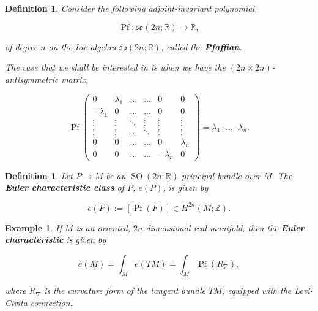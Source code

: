 \documentclass{article}
\newtheorem{defn}[theorem]{Definition\rm}
\newtheorem{example}{Example}
\newcommand{\ra}{\rightarrow}
\newcommand{\lra}{\longrightarrow}
\newcommand{\RR}{\mathbb{R}}
\newcommand{\ZZ}{\mathbb{Z}}
\newcommand{\mf}[1]{\mathfrak{#1}}
\DeclareMathOperator{\Pf}{Pf}
\DeclareMathOperator{\SO}{SO}
\begin{document}
\begin{defn}
	Consider the following adjoint-invariant polynomial,
	
	\begin{equation*}
		\Pf : \mf{so}(2n;\RR) \lra \RR,
	\end{equation*}

	of degree $n$ on the Lie algebra $\mf{so}(2n;\RR)$, called the \textbf{Pfaffian}.
	
	The case that we shall be interested in is when we have the $(2n \times 2n)$-antisymmetric matrix,
	
	\begin{equation*}
		\Pf
		\begin{pmatrix}
			0 & \lambda_{1} & \dots & \dots & 0 & 0 \\
			-\lambda_{1} & 0 & \dots & \dots & 0 & 0 \\
			\vdots & \vdots & \ddots & \vdots & \vdots & \vdots \\
			\vdots & \vdots & \dots & \ddots & \vdots & \vdots \\
			0 & 0 & \dots & \dots & 0 & \lambda_{n} \\
			0 & 0 & \dots & \dots & -\lambda_{n} & 0			
		\end{pmatrix}
		= \lambda_{1}\cdot\ldots \cdot \lambda_{n}.
	\end{equation*}
	
\end{defn}

\begin{defn}
	
	Let $P \ra M$ be an $\SO(2n;\RR)$-principal bundle over $M$. The \textbf{Euler characteristic class} of $P$, $e(P)$, is given by
	
	\begin{equation*}
		e(P) := [\Pf(F)] \in H^{2n}(M; \ZZ).
	\end{equation*}

\end{defn}

\begin{example}
	If $M$ is an oriented, $2n$-dimensional real manifold, then the \textbf{Euler characteristic} is given by

	\begin{equation*}
		e(M) = \int_{M} e(TM) = \int_{M} \Pf(R_{\nabla}),
	\end{equation*}

	where $R_{\nabla}$ is the curvature form of the tangent bundle $TM$, equipped with the Levi-Civita connection.
\end{example}
\end{document}
